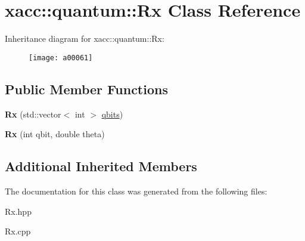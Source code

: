 \hypertarget{a00061}{}\section{xacc\+:\+:quantum\+:\+:Rx Class Reference}
\label{a00061}
Inheritance diagram for xacc\+:\+:quantum\+:\+:Rx\+:\begin{figure}[H]
\begin{center}
\leavevmode
\texttt{[image: a00061]}
\end{center}
\end{figure}
\subsection*{Public Member Functions}
\begin{DoxyCompactItemize}
\item 
{\bfseries Rx} (std\+::vector$<$ int $>$ \hyperlink{a00033_a2a56be6c2519ea65df4d06f4abae1393}{qbits})\hypertarget{a00061_a03babfe938a6cbf7f744fcd31a52d92d}{}\label{a00061_a03babfe938a6cbf7f744fcd31a52d92d}

\item 
{\bfseries Rx} (int qbit, double theta)\hypertarget{a00061_a01667b11d34d5621b98ebff9a07d9bbf}{}\label{a00061_a01667b11d34d5621b98ebff9a07d9bbf}

\end{DoxyCompactItemize}
\subsection*{Additional Inherited Members}


The documentation for this class was generated from the following files\+:\begin{DoxyCompactItemize}
\item 
Rx.\+hpp\item 
Rx.\+cpp\end{DoxyCompactItemize}
